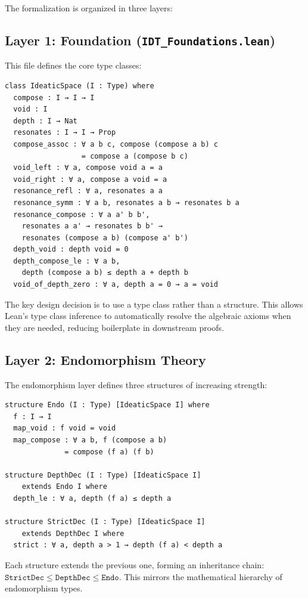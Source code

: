 \documentclass[11pt,openany]{book}
\theoremstyle{definition}
\theoremstyle{plain}
\theoremstyle{remark}
\begin{document}
The formalization is organized in three layers:

\subsection{Layer 1: Foundation (\texttt{IDT\_Foundations.lean})}

This file defines the core type classes:

\begin{lstlisting}[language=Lean4]
class IdeaticSpace (I : Type) where
  compose : I → I → I
  void : I
  depth : I → Nat
  resonates : I → I → Prop
  compose_assoc : ∀ a b c, compose (compose a b) c
                  = compose a (compose b c)
  void_left : ∀ a, compose void a = a
  void_right : ∀ a, compose a void = a
  resonance_refl : ∀ a, resonates a a
  resonance_symm : ∀ a b, resonates a b → resonates b a
  resonance_compose : ∀ a a' b b',
    resonates a a' → resonates b b' →
    resonates (compose a b) (compose a' b')
  depth_void : depth void = 0
  depth_compose_le : ∀ a b,
    depth (compose a b) ≤ depth a + depth b
  void_of_depth_zero : ∀ a, depth a = 0 → a = void
\end{lstlisting}

The key design decision is to use a type class rather than a structure. This allows Lean's type class inference to automatically resolve the algebraic axioms when they are needed, reducing boilerplate in downstream proofs.

\subsection{Layer 2: Endomorphism Theory}

The endomorphism layer defines three structures of increasing strength:

\begin{lstlisting}[language=Lean4]
structure Endo (I : Type) [IdeaticSpace I] where
  f : I → I
  map_void : f void = void
  map_compose : ∀ a b, f (compose a b)
              = compose (f a) (f b)

structure DepthDec (I : Type) [IdeaticSpace I]
    extends Endo I where
  depth_le : ∀ a, depth (f a) ≤ depth a

structure StrictDec (I : Type) [IdeaticSpace I]
    extends DepthDec I where
  strict : ∀ a, depth a > 1 → depth (f a) < depth a
\end{lstlisting}

Each structure extends the previous one, forming an inheritance chain: $\texttt{StrictDec} \leq \texttt{DepthDec} \leq \texttt{Endo}$. This mirrors the mathematical hierarchy of endomorphism types.
\end{document}
